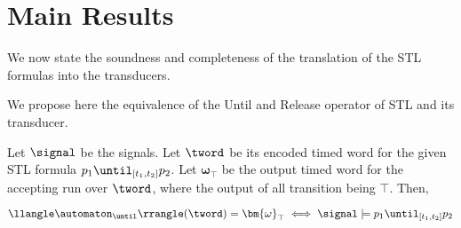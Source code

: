 \section{Main Results}
\label{sec:results}
We now state the soundness and completeness of the translation of the STL formulas into the transducers.

We propose here the equivalence of the Until and Release operator of STL and its transducer. %

\begin{proposition}    
\label{propo1}
        Let $\signal$ be the signals. Let $\tword$ be its encoded timed word for the given STL formula $p_1\until_{[t_1,t_2]}p_2$. %
        Let $\bm{\omega}_{\top}$ be the output timed word for the accepting run over $\tword$, where the output of all transition being $\top$. Then,

        
        \[
            \llangle\automaton_{\until}\rrangle(\tword) = \bm{\omega}_{\top} \iff \signal \models p_1 \until_{[t_1, t_2]} p_2
        \]
        
\end{proposition}

